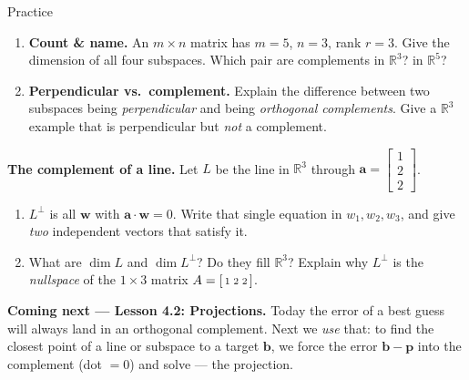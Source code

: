 \documentclass[10pt]{article}
\newcommand{\ww}{\mathbf{w}}
\newcommand{\yy}{\mathbf{y}}
\newcommand{\bb}{\mathbf{b}}
\newcommand{\pp}{\mathbf{p}}
\newcommand{\avec}{\mathbf{a}}
\begin{document}
\begin{notesbox}{Practice}
\begin{enumerate}[leftmargin=1.9em, itemsep=11pt]
\begin{enumerate}[label=(\alph*), leftmargin=1.8em, itemsep=5pt]
      \item Dot $\yy$ with each \emph{column} of $C$. What pairing does this confirm? \vspace{0.9cm}
    \end{enumerate}
  \item \textbf{Count \& name.} An $m\times n$ matrix has $m=5$, $n=3$, rank $r=3$. Give the dimension
        of all four subspaces. Which pair are complements in $\mathbb{R}^3$? in $\mathbb{R}^5$?
  \item \textbf{Perpendicular vs.\ complement.} Explain the difference between two subspaces being
        \emph{perpendicular} and being \emph{orthogonal complements}. Give a $\mathbb{R}^3$ example that
        is perpendicular but \emph{not} a complement. 
\end{enumerate}
\end{notesbox}

\begin{extensionbox}
\textbf{The complement of a line.} Let $L$ be the line in $\mathbb{R}^3$ through
$\avec=\begin{bmatrix} 1\\2\\2 \end{bmatrix}$.
\begin{enumerate}[label=(\alph*), leftmargin=1.8em, itemsep=5pt]
  \item $L^{\perp}$ is all $\ww$ with $\avec\cdot\ww=0$. Write that single equation in $w_1,w_2,w_3$, and
        give \emph{two} independent vectors that satisfy it.
  \item What are $\dim L$ and $\dim L^{\perp}$? Do they fill $\mathbb{R}^3$? Explain why $L^{\perp}$ is the
        \emph{nullspace} of the $1\times 3$ matrix $A=\begin{bsmallmatrix} 1 & 2 & 2 \end{bsmallmatrix}$.
\end{enumerate}
\end{extensionbox}

\begin{spiralbox}
\textbf{Coming next --- Lesson 4.2: Projections.} Today the error of a best guess will always land in an
orthogonal complement. Next we \emph{use} that: to find the closest point of a line or subspace to a
target $\bb$, we force the error $\bb-\pp$ into the complement (dot $=0$) and solve --- the projection.
\end{spiralbox}
\end{document}

